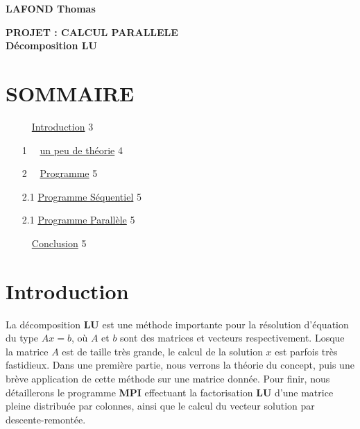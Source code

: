 \documentclass[10pt,a4paper]{article}
\begin{document}
\thispagestyle{empty} 

\begin{flushleft}
\textbf{LAFOND Thomas}\\
\end{flushleft}

\begin{LARGE}
\begin{center}
\vfill
\textbf{PROJET : CALCUL PARALLELE}\\
\textbf{Décomposition LU}
\vfill
\end{center}
\end{LARGE}


\newpage

\section*{SOMMAIRE}
\hypertarget{SOMMAIRE}{}


\begin{itemize}
 \item[] ~~\hyperlink{Introduction}{Introduction} \hfill 3\\
 \item[1] ~~\hyperlink{un peu de théorie}{un peu de théorie} \hfill 4\\
 \item[2] ~~\hyperlink{Programme}{Programme} \hfill 5\\
 \item[2.1] \hyperlink{Programme Séquentiel}{Programme Séquentiel} \hfill 5\\
 \item[2.1] \hyperlink{Programme Parallèle}{Programme Parallèle} \hfill 5\\
 \item[] ~~\hyperlink{Conclusion}{Conclusion} \hfill 5\\

\end{itemize}

\newpage

\section*{Introduction}
\hypertarget{Introduction}{}

La décomposition \textbf{LU} est une méthode importante pour la résolution d'équation du type $Ax=b$, où $A$ et $b$ sont des matrices et vecteurs respectivement. Losque la matrice $A$ est de taille très grande, le calcul de la solution $x$ est parfois très fastidieux. Dans une première partie, nous verrons la théorie du concept, puis une brève application de cette méthode sur une matrice donnée. Pour finir, nous détaillerons le programme \textbf{MPI} effectuant la factorisation \textbf{LU} d'une matrice pleine distribuée par colonnes, ainsi que le calcul du vecteur solution par descente-remontée. 
\newpage
\end{document}

